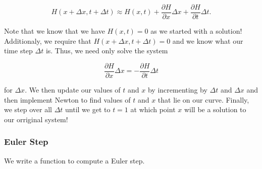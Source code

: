 \documentclass[11pt]{article}
\begin{document}
\[
    H(x + \Delta x, t + \Delta t) \approx H(x,t) + \frac{\partial H}{\partial x} \Delta x
 + \frac{\partial H}{\partial t} \Delta t. 
 \]

Note that we know that we have \(H(x,t) = 0\) as we started with a
solution! Additionaly, we require that
\(H(x + \Delta x, t + \Delta t) = 0\) and we know what our time step
\(\Delta t\) is. Thus, we need only solve the system

\[
    \frac{\partial H}{\partial x} \Delta x = -\frac{\partial H}{\partial t} \Delta t
\]

for \(\Delta x\). We then update our values of \(t\) and \(x\) by
incrementing by \(\Delta t\) and \(\Delta x\) and then implement Newton
to find values of \(t\) and \(x\) that lie on our curve. Finally, we
step over all \(\Delta t\) until we get to \(t = 1\) at which point
\(x\) will be a solution to our orriginal system!

    \hypertarget{euler-step}{%
\subsubsection{Euler Step}\label{euler-step}}

We write a function to compute a Euler step.
\end{document}
